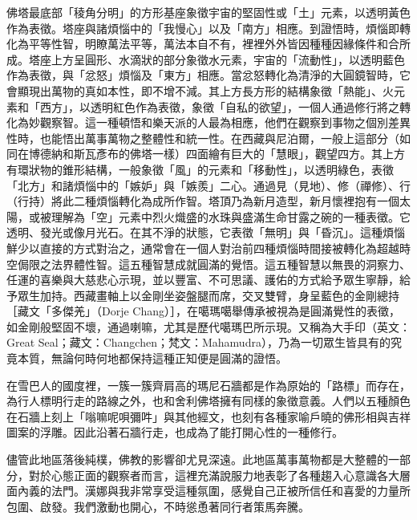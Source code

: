 佛塔最底部「稜角分明」的方形基座象徵宇宙的堅固性或「土」元素，以透明黃色作為表徵。塔座與諸煩惱中的「我慢心」以及「南方」相應。到證悟時，煩惱即轉化為平等性智，明瞭萬法平等，萬法本自不有，裡裡外外皆因種種因緣條件和合所成。塔座上方呈圓形、水滴狀的部分象徵水元素，宇宙的「流動性」，以透明藍色作為表徵，與「忿怒」煩惱及「東方」相應。當忿怒轉化為清淨的大圓鏡智時，它會顯現出萬物的真如本性，即不增不減。其上方長方形的結構象徵「熱能」、火元素和「西方」，以透明紅色作為表徵，象徵「自私的欲望」，一個人通過修行將之轉化為妙觀察智。這一種頓悟和樂天派的人最為相應，他們在觀察到事物之個別差異性時，也能悟出萬事萬物之整體性和統一性。在西藏與尼泊爾，一般上這部分（如同在博德納和斯瓦彥布的佛塔一樣）四面繪有巨大的「慧眼」，觀望四方。其上方有環狀物的錐形結構，一般象徵「風」的元素和「移動性」，以透明綠色，表徵「北方」和諸煩惱中的「嫉妒」與「嫉羨」二心。通過見（見地）、修（禪修）、行（行持）將此二種煩惱轉化為成所作智。塔頂乃為新月造型，新月懷裡抱有一個太陽，或被理解為「空」元素中烈火熾盛的水珠與盛滿生命甘露之碗的一種表徵。它透明、發光或像月光石。在其不淨的狀態，它表徵「無明」與「昏沉」。這種煩惱鮮少以直接的方式對治之，通常會在一個人對治前四種煩惱時間接被轉化為超越時空侷限之法界體性智。這五種智慧成就圓滿的覺悟。這五種智慧以無畏的洞察力、任運的喜樂與大慈悲心示現，並以豐富、不可思議、護佑的方式給予眾生寧靜，給予眾生加持。西藏畫軸上以金剛坐姿盤腿而席，交叉雙臂，身呈藍色的金剛總持［藏文「多傑羌」（Dorje
Chang）］，在噶瑪噶舉傳承被視為是圓滿覺性的表徵，如金剛般堅固不壞，通過喇嘛，尤其是歷代噶瑪巴所示現。又稱為大手印（英文：Great
Seal；藏文：Changchen；梵文：Mahamudra），乃為一切眾生皆具有的究竟本質，無論何時何地都保持這種正知便是圓滿的證悟。

在雪巴人的國度裡，一簇一簇齊肩高的瑪尼石牆都是作為原始的「路標」而存在，為行人標明行走的路線之外，也和舍利佛塔擁有同樣的象徵意義。人們以五種顏色在石牆上刻上「嗡嘛呢唄彌吽」與其他經文，也刻有各種家喻戶曉的佛形相與吉祥圖案的浮雕。因此沿著石牆行走，也成為了能打開心性的一種修行。

儘管此地區落後純樸，佛教的影響卻尤見深遠。此地區萬事萬物都是大整體的一部分，對於心態正面的觀察者而言，這裡充滿說服力地表彰了各種趨入心意識各大層面內義的法門。漢娜與我非常享受這種氛圍，感覺自己正被所信任和喜愛的力量所包圍、啟發。我們激動也開心，不時慫恿著同行者策馬奔騰。

